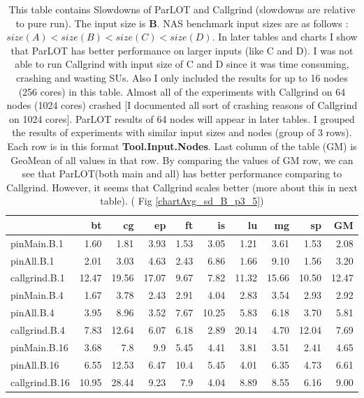 \begin{table*}[]
\caption{This table contains Slowdowns of ParLOT and Callgrind (slowdowns are relative to pure run). The input size is \textbf{B}.  NAS benchmark input sizes are as follows : $size(A) < size(B) < size (C) < size(D) $. In later tables and charts I show that ParLOT has better performance on larger inputs (like C and D). I was not able to run Callgrind with input size of C and D since it was time consuming, crashing and wasting SUs. Also I only included the results for up to 16 nodes (256 cores) in this table. Almost all of the experiments with Callgrind on 64 nodes (1024 cores) crashed [I documented all sort of crashing reasons of Callgrind on 1024 cores]. ParLOT results of 64 nodes will appear in later tables. I grouped the results of experiments with similar input sizes and nodes (group of 3 rows). Each row is in this format \textbf{Tool.Input.Nodes}. Last column of the table (GM) is GeoMean of all values in that row. By comparing the values of GM row, we can see that ParLOT(both main and all) has better performance comparing to Callgrind. However, it seems that Callgrind scales better (more about this in next table). ( Fig \ref{chartAvg_sd_B_p3_5})}
\label{sd_pMpAcg_B_int_p3.5}
\begin{center}
\begin{tabular}{|l|rrrrrrrr|r|}
\hline
                &    bt &    cg &    ep &   ft &    is &    lu &    mg &    sp &    GM \\
\hline
 pinMain.B.1    &  1.60 &  1.81 &  3.93 & 1.53 &  3.05 &  1.21 &  3.61 &  1.53 &  2.08 \\
 pinAll.B.1     &  2.01 &  3.03 &  4.63 & 2.43 &  6.86 &  1.66 &  9.10 &  1.56 &   3.20 \\
 callgrind.B.1  & 12.47 & 19.56 & 17.07 & 9.67 &  7.82 & 11.32 & 15.66 &  10.50 & 12.47 \\
\hline
 pinMain.B.4    &  1.67 &  3.78 &  2.43 & 2.91 &  4.04 &  2.83 &  3.54 &  2.93 &  2.92 \\
 pinAll.B.4     &  3.95 &  8.96 &  3.52 & 7.67 & 10.25 &  5.83 &  6.18 &   3.70 &  5.81 \\
 callgrind.B.4  &  7.83 & 12.64 &  6.07 & 6.18 &  2.89 & 20.14 &   4.70 & 12.04 &  7.69 \\
 \hline
 pinMain.B.16   &  3.68 &   7.8 &   9.9 & 5.45 &  4.41 &  3.81 &  3.51 &  2.41 &  4.65 \\
 pinAll.B.16    &  6.55 & 12.53 &  6.47 & 10.4 &  5.45 &  4.01 &  6.35 &  4.73 &  6.61 \\
 callgrind.B.16 & 10.95 & 28.44 &  9.23 &  7.9 &  4.04 &  8.89 &  8.55 &  6.16 &     9.00 \\

\hline
\end{tabular}
\end{center}
\end{table*}
